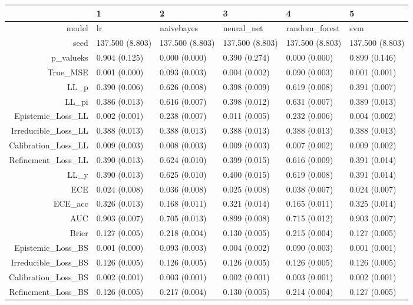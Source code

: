 \begin{table}[ht]
\centering
\begin{tabular}{rlllll}
  \hline
 & 1 & 2 & 3 & 4 & 5 \\ 
  \hline
model & lr & naivebayes & neural\_net & random\_forest & svm \\ 
  seed & 137.500 (8.803) & 137.500 (8.803) & 137.500 (8.803) & 137.500 (8.803) & 137.500 (8.803) \\ 
  p\_valueks & 0.904 (0.125) & 0.000 (0.000) & 0.390 (0.274) & 0.000 (0.000) & 0.899 (0.146) \\ 
  True\_MSE & 0.001 (0.000) & 0.093 (0.003) & 0.004 (0.002) & 0.090 (0.003) & 0.001 (0.001) \\ 
  LL\_p & 0.390 (0.006) & 0.626 (0.008) & 0.398 (0.009) & 0.619 (0.008) & 0.391 (0.007) \\ 
  LL\_pi & 0.386 (0.013) & 0.616 (0.007) & 0.398 (0.012) & 0.631 (0.007) & 0.389 (0.013) \\ 
  Epistemic\_Loss\_LL & 0.002 (0.001) & 0.238 (0.007) & 0.011 (0.005) & 0.232 (0.006) & 0.004 (0.002) \\ 
  Irreducible\_Loss\_LL & 0.388 (0.013) & 0.388 (0.013) & 0.388 (0.013) & 0.388 (0.013) & 0.388 (0.013) \\ 
  Calibration\_Loss\_LL & 0.009 (0.003) & 0.008 (0.003) & 0.009 (0.003) & 0.007 (0.002) & 0.009 (0.002) \\ 
  Refinement\_Loss\_LL & 0.390 (0.013) & 0.624 (0.010) & 0.399 (0.015) & 0.616 (0.009) & 0.391 (0.014) \\ 
  LL\_y & 0.390 (0.013) & 0.625 (0.010) & 0.400 (0.015) & 0.619 (0.008) & 0.391 (0.014) \\ 
  ECE & 0.024 (0.008) & 0.036 (0.008) & 0.025 (0.008) & 0.038 (0.007) & 0.024 (0.007) \\ 
  ECE\_acc & 0.326 (0.013) & 0.168 (0.011) & 0.321 (0.014) & 0.165 (0.011) & 0.325 (0.014) \\ 
  AUC & 0.903 (0.007) & 0.705 (0.013) & 0.899 (0.008) & 0.715 (0.012) & 0.903 (0.007) \\ 
  Brier & 0.127 (0.005) & 0.218 (0.004) & 0.130 (0.005) & 0.215 (0.004) & 0.127 (0.005) \\ 
  Epistemic\_Loss\_BS & 0.001 (0.000) & 0.093 (0.003) & 0.004 (0.002) & 0.090 (0.003) & 0.001 (0.001) \\ 
  Irreducible\_Loss\_BS & 0.126 (0.005) & 0.126 (0.005) & 0.126 (0.005) & 0.126 (0.005) & 0.126 (0.005) \\ 
  Calibration\_Loss\_BS & 0.002 (0.001) & 0.003 (0.001) & 0.002 (0.001) & 0.003 (0.001) & 0.002 (0.001) \\ 
  Refinement\_Loss\_BS & 0.126 (0.005) & 0.217 (0.004) & 0.130 (0.005) & 0.214 (0.004) & 0.127 (0.005) \\ 
   \hline
\end{tabular}
\end{table}
